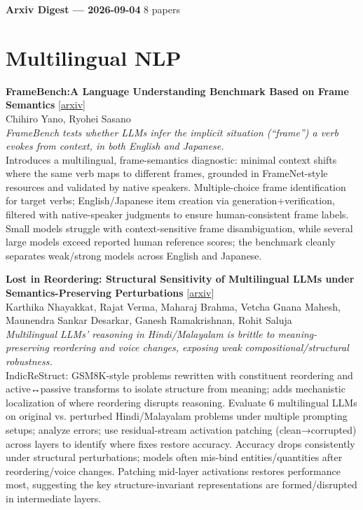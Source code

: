 \documentclass[12pt,letterpaper]{article}
\begin{document}
{\footnotesize\textbf{Arxiv Digest --- 2026-09-04} \hfill 8 papers}

\smallskip

\section*{Multilingual NLP}

{\small\textbf{FrameBench:A Language Understanding Benchmark Based on Frame Semantics}} {\scriptsize[\href{https://arxiv.org/abs/2609.03370}{arxiv}]}\\
{\scriptsize Chihiro Yano, Ryohei Sasano}\\

{\small\textit{FrameBench tests whether LLMs infer the implicit situation (``frame'') a verb evokes from context, in both English and Japanese.}}\\[1pt]
{\footnotesize Introduces a multilingual, frame-semantics diagnostic: minimal context shifts where the same verb maps to different frames, grounded in FrameNet-style resources and validated by native speakers. Multiple-choice frame identification for target verbs; English/Japanese item creation via generation+verification, filtered with native-speaker judgments to ensure human-consistent frame labels. Small models struggle with context-sensitive frame disambiguation, while several large models exceed reported human reference scores; the benchmark cleanly separates weak/strong models across English and Japanese.}

\medskip

{\small\textbf{Lost in Reordering: Structural Sensitivity of Multilingual LLMs under Semantics-Preserving Perturbations}} {\scriptsize[\href{https://arxiv.org/abs/2609.03511}{arxiv}]}\\
{\scriptsize Karthika Nhayakkat, Rajat Verma, Maharaj Brahma, Vetcha Gnana Mahesh, Maunendra Sankar Desarkar, Ganesh Ramakrishnan, Rohit Saluja}\\

{\small\textit{Multilingual LLMs' reasoning in Hindi/Malayalam is brittle to meaning-preserving reordering and voice changes, exposing weak compositional/structural robustness.}}\\[1pt]
{\footnotesize IndicReStruct: GSM8K-style problems rewritten with constituent reordering and active↔passive transforms to isolate structure from meaning; adds mechanistic localization of where reordering disrupts reasoning. Evaluate 6 multilingual LLMs on original vs. perturbed Hindi/Malayalam problems under multiple prompting setups; analyze errors; use residual-stream activation patching (clean→corrupted) across layers to identify where fixes restore accuracy. Accuracy drops consistently under structural perturbations; models often mis-bind entities/quantities after reordering/voice changes. Patching mid-layer activations restores performance most, suggesting the key structure-invariant representations are formed/disrupted in intermediate layers.}
\end{document}
